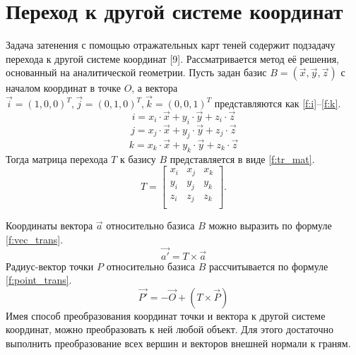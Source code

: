 \section{Переход к другой системе координат} {
    Задача затенения с помощью отражательных карт теней содержит подзадачу
    перехода к другой системе координат [9].
    Рассматривается метод её решения, основанный на аналитической геометрии.
    Пусть задан базис $B = (\vec{x}, \vec{y}, \vec{z})$
    с началом координат в точке $O$,
    а вектора $\vec{i} = (1, 0, 0)^T, \vec{j} = (0, 1, 0)^T, \vec{k} = (0, 0, 1)^T$
    представляются как \ref{f:i}--\ref{f:k}.
    \begin{equation}
        \label{f:i}
        i = x_i \cdot \vec{x} + y_i \cdot \vec{y} + z_i \cdot \vec{z}
    \end{equation}
     \begin{equation}
        \label{f:j}
        j = x_j \cdot \vec{x} + y_j \cdot \vec{y} + z_j \cdot \vec{z}
    \end{equation}
     \begin{equation}
        \label{f:k}
        k = x_k \cdot \vec{x} + y_k \cdot \vec{y} + z_k \cdot \vec{z}
    \end{equation}
    Тогда матрица перехода $T$ к базису $B$ представляется в виде \ref{f:tr_mat}. \\
    \begin{equation}
        T = \begin{bmatrix}
            \label{f:tr_mat}
            x_i & x_j & x_k \\
            y_i & y_j & y_k \\
            z_i & z_j & z_k \\
        \end{bmatrix}.
    \end{equation}
    
    Координаты вектора $\vec{a}$ относительно базиса $B$ можно выразить по формуле \ref{f:vec_trans}.
    \begin{equation}
        \label{f:vec_trans}
        \vec{a'} = T \times \vec{a}
    \end{equation}
    Радиус-вектор точки $P$ относительно базиса $B$
    рассчитывается по формуле \ref{f:point_trans}.
    \begin{equation}
        \label{f:point_trans}
        \vec{P'} = -\vec{O} + (T \times \vec{P})
    \end{equation}
    Имея способ преобразования координат точки и вектора к другой системе координат,
    можно преобразовать к ней любой объект.
    Для этого достаточно выполнить преобразование всех вершин и
    векторов внешней нормали к граням.
}